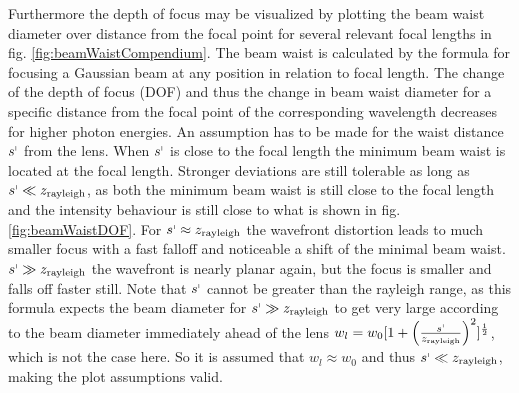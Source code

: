 \documentclass[twoside,openright,listof=numbered]{scrreprt}
\begin{document}
Furthermore the depth of focus may be visualized by plotting the beam waist diameter over distance from the focal point for several relevant focal lengths in fig. \ref{fig:beamWaistCompendium}. The beam waist is calculated by the formula for focusing a Gaussian beam at any position in relation to focal length. The change of the depth of focus (DOF) and thus the change in beam waist diameter for a specific distance from the focal point of the corresponding wavelength decreases for higher photon energies. An assumption has to be made for the waist distance $s^\shortmid$ from the lens. When $s^\shortmid$ is close to the focal length the minimum beam waist is located at the focal length. Stronger deviations are still tolerable as long as $s^\shortmid \ll z_\text{rayleigh}$, as both the minimum beam waist is still close to the focal length and the intensity behaviour is still close to what is shown in fig. \ref{fig:beamWaistDOF}. For $s^\shortmid \approx z_\text{rayleigh}$ the wavefront distortion leads to much smaller focus with a fast falloff and noticeable a shift of the minimal beam waist. $s^\shortmid \gg z_\text{rayleigh}$ the wavefront is nearly planar again, but the focus is smaller and falls off faster still. Note that $s^\shortmid$ cannot be greater than the rayleigh range, as this formula expects the beam diameter for $s^\shortmid \gg z_\text{rayleigh}$ to get very large according to the beam diameter immediately ahead of the lens $w_l = w_0 [1+\left(\frac{s^\shortmid}{z_\text{rayleigh}}\right)^2]^\frac{1}{2}$, which is not the case here. So it is assumed that $w_l \approx w_0$ and thus $s^\shortmid \ll z_\text{rayleigh}$, making the plot assumptions valid.\cite{Li1994}
\end{document}
